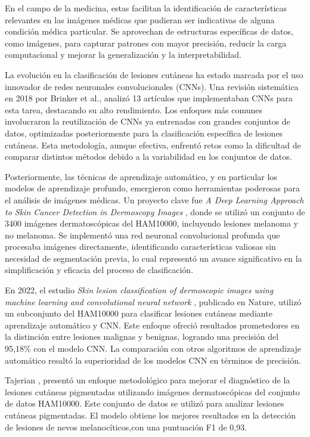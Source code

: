 En el campo de la medicina, estas facilitan la identificación de características relevantes en las imágenes médicas que pudieran ser indicativas de alguna condición médica particular. Se aprovechan de estructuras específicas de datos, como imágenes, para capturar patrones con mayor precisión, reducir la carga computacional y mejorar la generalización y la interpretabilidad. 

La evolución en la clasificación de lesiones cutáneas ha estado marcada por el uso innovador de redes neuronales convolucionales (CNNs). Una revisión sistemática en 2018 por Brinker et al.,  analizó 13 artículos que implementaban CNNs para esta tarea, destacando su alto rendimiento. Los enfoques más comunes involucraron la reutilización de CNNs ya entrenadas con grandes conjuntos de datos, optimizadas posteriormente para la clasificación específica de lesiones cutáneas. Esta metodología, aunque efectiva, enfrentó retos como la dificultad de comparar distintos métodos debido a la variabilidad en los conjuntos de datos.

Posteriormente, las técnicas de aprendizaje automático, y en particular los modelos de aprendizaje profundo, emergieron como herramientas poderosas para el análisis de imágenes médicas. Un proyecto clave fue \textit{A Deep Learning Approach to Skin Cancer Detection in Dermoscopy Images} , donde se utilizó un conjunto de 3400 imágenes dermatoscópicas del HAM10000, incluyendo lesiones melanoma y no melanoma. Se implementó una red neuronal convolucional profunda que procesaba imágenes directamente, identificando características valiosas sin necesidad de segmentación previa, lo cual representó un avance significativo en la simplificación y eficacia del proceso de clasificación.

En 2022, el estudio \textit{Skin lesion classification of dermoscopic images using machine learning and convolutional neural network} , publicado en Nature, utilizó un subconjunto del HAM10000 para clasificar lesiones cutáneas mediante aprendizaje automático y CNN. Este enfoque ofreció resultados prometedores en la distinción entre lesiones malignas y benignas, logrando una precisión del 95,18\% con el modelo CNN. La comparación con otros algoritmos de aprendizaje automático resaltó la superioridad de los modelos CNN en términos de precisión.

Tajerian ,  presentó un enfoque metodológico para mejorar el diagnóstico de la lesiones cutáneas pigmentadas utilizando imágenes dermatoscópicas del conjunto de datos HAM10000. Este conjunto de datos se utilizó para analizar lesiones cutáneas pigmentadas. El modelo obtiene los mejores resultados en la detección de lesiones de nevos melanocíticos,con una puntuación F1 de 0,93.

